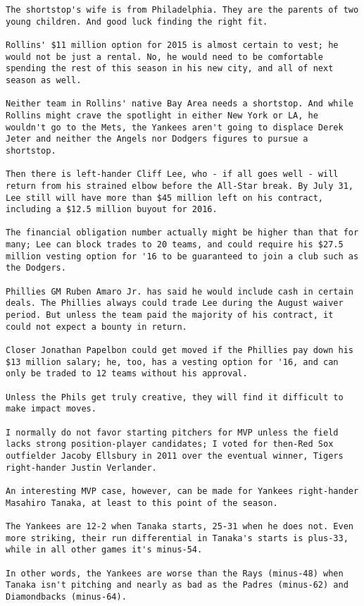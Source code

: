 \begin{lstlisting}
The shortstop's wife is from Philadelphia. They are the parents of two young children. And good luck finding the right fit.

Rollins' $11 million option for 2015 is almost certain to vest; he would not be just a rental. No, he would need to be comfortable spending the rest of this season in his new city, and all of next season as well.

Neither team in Rollins' native Bay Area needs a shortstop. And while Rollins might crave the spotlight in either New York or LA, he wouldn't go to the Mets, the Yankees aren't going to displace Derek Jeter and neither the Angels nor Dodgers figures to pursue a shortstop.

Then there is left-hander Cliff Lee, who - if all goes well - will return from his strained elbow before the All-Star break. By July 31, Lee still will have more than $45 million left on his contract, including a $12.5 million buyout for 2016.

The financial obligation number actually might be higher than that for many; Lee can block trades to 20 teams, and could require his $27.5 million vesting option for '16 to be guaranteed to join a club such as the Dodgers.

Phillies GM Ruben Amaro Jr. has said he would include cash in certain deals. The Phillies always could trade Lee during the August waiver period. But unless the team paid the majority of his contract, it could not expect a bounty in return.

Closer Jonathan Papelbon could get moved if the Phillies pay down his $13 million salary; he, too, has a vesting option for '16, and can only be traded to 12 teams without his approval.

Unless the Phils get truly creative, they will find it difficult to make impact moves.

I normally do not favor starting pitchers for MVP unless the field lacks strong position-player candidates; I voted for then-Red Sox outfielder Jacoby Ellsbury in 2011 over the eventual winner, Tigers right-hander Justin Verlander.

An interesting MVP case, however, can be made for Yankees right-hander Masahiro Tanaka, at least to this point of the season.

The Yankees are 12-2 when Tanaka starts, 25-31 when he does not. Even more striking, their run differential in Tanaka's starts is plus-33, while in all other games it's minus-54.

In other words, the Yankees are worse than the Rays (minus-48) when Tanaka isn't pitching and nearly as bad as the Padres (minus-62) and Diamondbacks (minus-64).


\end{lstlisting}
